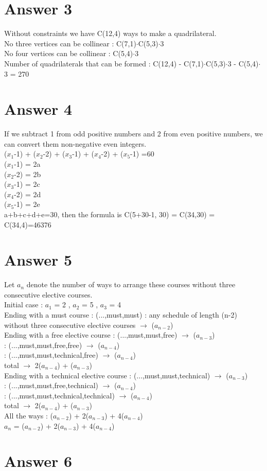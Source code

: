 \documentclass[12pt]{article}
\begin{document}
\section*{Answer 3}
Without constraints we have C(12,4) ways to make a quadrilateral. \\
No three vertices can be collinear : C(7,1)$\cdot$C(5,3)$\cdot$3 \\
No four vertices can be collinear : C(5,4)$\cdot$3 \\
Number of quadrilaterals that can be formed : C(12,4) - C(7,1)$\cdot$C(5,3)$\cdot$3 - C(5,4)$\cdot$3 = 270  \\
\section*{Answer 4}
 If we subtract 1 from odd positive numbers and 2 from even positive numbers, we can convert them non-negative even integers. \\
 ($x_{1}$-1) + ($x_{2}$-2) + ($x_{3}$-1) + ($x_{4}$-2) + ($x_{5}$-1) =60 \\
 ($x_{1}$-1) = 2a \\
 ($x_{2}$-2) = 2b \\
 ($x_{3}$-1) = 2c \\
 ($x_{4}$-2) = 2d \\
 ($x_{5}$-1) = 2e \\
 a+b+c+d+e=30, then the formula is C(5+30-1, 30) = C(34,30) = C(34,4)=46376 \\
\section*{Answer 5}
 Let $a_{n}$ denote the number of ways to arrange these courses without three  consecutive elective courses. \\
 Initial case : $a_{1}$ = 2 , $a_{2}$ = 5 , $a_{3}$ = 4 \\
 Ending with a must course : (...,must,must) : any schedule of length (n-2) without three consecutive elective courses $\rightarrow$ ($a_{n-2}$) \\
 Ending with a free elective course : (...,must,must,free) $\rightarrow$ ($a_{n-3}$) \\
 : (...,must,must,free,free) $\rightarrow$ ($a_{n-4}$) \\
 : (...,must,must,technical,free) $\rightarrow$ ($a_{n-4}$) \\
 total $\rightarrow$ 2($a_{n-4}$) + ($a_{n-3}$) \\
 Ending with a technical elective course : (...,must,must,technical) $\rightarrow$ ($a_{n-3}$) \\
 : (...,must,must,free,technical) $\rightarrow$ ($a_{n-4}$) \\
 : (...,must,must,technical,technical) $\rightarrow$ ($a_{n-4}$) \\
 total $\rightarrow$ 2($a_{n-4}$) + ($a_{n-3}$) \\
 All the ways : ($a_{n-2}$) + 2($a_{n-3}$) + 4($a_{n-4}$) \\
 $a_{n}$ = ($a_{n-2}$) + 2($a_{n-3}$) + 4($a_{n-4}$) \\
\section*{Answer 6}
\end{document}
